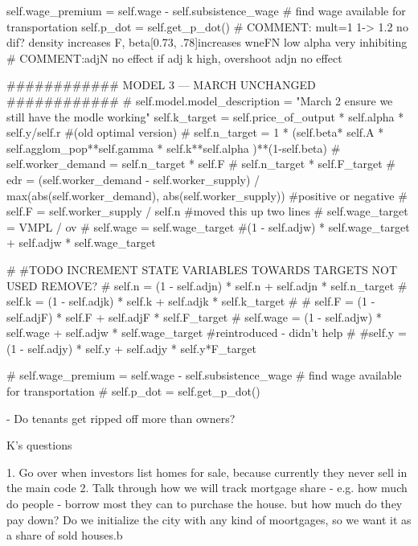         self.wage_premium     = self.wage - self.subsistence_wage # find wage available for transportation
        self.p_dot            = self.get_p_dot()
        # COMMENT: mult=1 1-> 1.2 no dif? density increases F, beta[0.73, .78]increases wneFN low alpha very inhibiting
        # COMMENT:adjN no effect if adj k high, overshoot adjn no effect


     ############   MODEL 3  --- MARCH UNCHANGED    ############ 
        #  self.model.model_description = "March 2 ensure we still have the modle working"        self.k_target = self.price_of_output * self.alpha * self.y/self.r     #(old optimal version)
        # self.n_target   = 1 * (self.beta* self.A * self.agglom_pop**self.gamma *  self.k**self.alpha )**(1-self.beta) 
        # self.worker_demand = self.n_target * self.F # self.n_target * self.F_target
        # edr = (self.worker_demand - self.worker_supply) / max(abs(self.worker_demand), abs(self.worker_supply)) #positive or negative 
        # self.F = self.worker_supply / self.n  #moved this up two lines
        # self.wage_target =  VMPL / ov
        # self.wage        = self.wage_target  #(1 - self.adjw) * self.wage_target + self.adjw * self.wage_target
        
        # #TODO INCREMENT STATE VARIABLES TOWARDS TARGETS     NOT USED  REMOVE?
        # self.n        = (1 - self.adjn) * self.n + self.adjn * self.n_target
        # self.k        = (1 - self.adjk) * self.k + self.adjk * self.k_target 
        # # self.F        = (1 - self.adjF) * self.F + self.adjF * self.F_target
        # self.wage     = (1 - self.adjw) * self.wage + self.adjw * self.wage_target  #reintroduced  - didn't help
        # #self.y        = (1 - self.adjy) * self.y + self.adjy * self.y*F_target 

        # self.wage_premium     = self.wage - self.subsistence_wage # find wage available for transportation
        # self.p_dot            = self.get_p_dot()

    
- Do tenants get ripped off more than owners?


K's questions

1. Go over when investors list homes for sale, because currently they never sell in the main code
2. Talk through  how we will track mortgage share - e.g. how much do people - borrow most they can to purchase the house. but how much do they pay down?
Do we initialize the city with any kind of moortgages, so we want it as a share of sold houses.b


